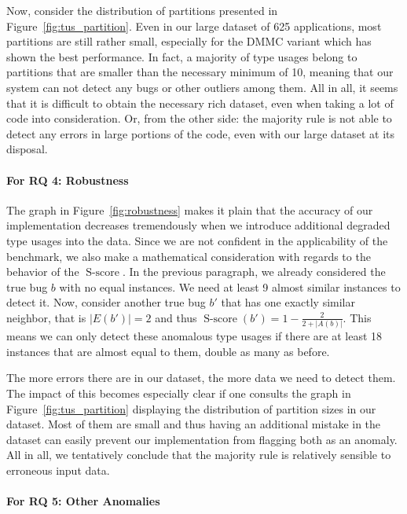 Now, consider the distribution of partitions presented in Figure~\ref{fig:tus_partition}.
Even in our large dataset of 625 applications, most partitions are still rather small, especially for the $\text{DMMC}$ variant which has shown the best performance.
In fact, a majority of type usages belong to partitions that are smaller than the necessary minimum of 10, meaning that our system can not detect any bugs or other outliers among them.
All in all, it seems that it is difficult to obtain the necessary rich dataset, even when taking a lot of code into consideration.
Or, from the other side: the majority rule is not able to detect any errors in large portions of the code, even with our large dataset at its disposal.

\paragraph{For RQ 4: Robustness}

The graph in Figure~\ref{fig:robustness}  makes it plain that the accuracy of our implementation decreases tremendously when we introduce additional degraded type usages into the data.
Since we are not confident in the applicability of the benchmark, we also make a mathematical consideration with regards to the behavior of the $\operatorname{S-score}$.
In the previous paragraph, we already considered the true bug $b$ with no equal instances.
We need at least 9 almost similar instances to detect it.
Now, consider another true bug $b'$ that has one exactly similar neighbor, that is $|E(b')|=2$ and thus $\operatorname{S-score}(b')=1-\frac{2}{2+|A(b)|}$.
This means we can only detect these anomalous type usages if there are at least 18 instances that are almost equal to them, double as many as before.

The more errors there are in our dataset, the more data we need to detect them.
The impact of this becomes especially clear if one consults the graph in Figure~\ref{fig:tus_partition} displaying the distribution of partition sizes in our dataset.
Most of them are small and thus having an additional mistake in the dataset can easily prevent our implementation from flagging both as an anomaly.
All in all, we tentatively conclude that the majority rule is relatively sensible to erroneous input data.

\paragraph{For RQ 5: Other Anomalies}

